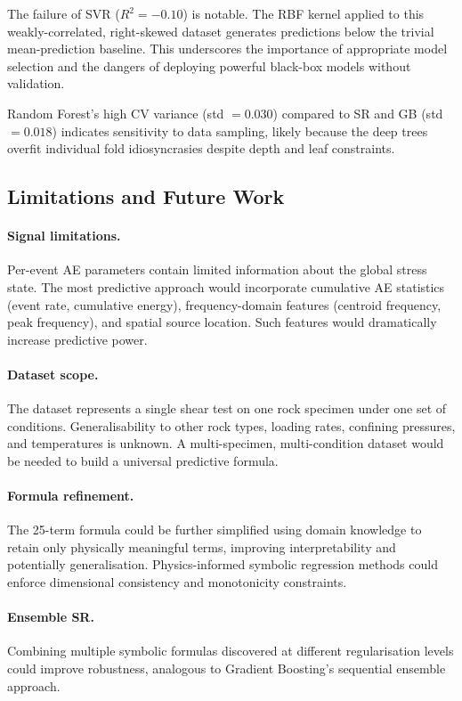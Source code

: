 \documentclass[12pt,a4paper]{article}
\begin{document}
The failure of SVR ($R^{2} = -0.10$) is notable. The RBF kernel applied to this
weakly-correlated, right-skewed dataset generates predictions below the trivial
mean-prediction baseline. This underscores the importance of appropriate model
selection and the dangers of deploying powerful black-box models without
validation.

Random Forest's high CV variance (std $= 0.030$) compared to SR and GB (std
$= 0.018$) indicates sensitivity to data sampling, likely because the deep trees
overfit individual fold idiosyncrasies despite depth and leaf constraints.

\subsection{Limitations and Future Work}
\label{subsec:limitations}

\paragraph{Signal limitations.}
Per-event AE parameters contain limited information about the global stress
state. The most predictive approach would incorporate cumulative AE statistics
(event rate, cumulative energy), frequency-domain features (centroid frequency,
peak frequency), and spatial source location. Such features would dramatically
increase predictive power.

\paragraph{Dataset scope.}
The dataset represents a single shear test on one rock specimen under one set of
conditions. Generalisability to other rock types, loading rates, confining
pressures, and temperatures is unknown. A multi-specimen, multi-condition dataset
would be needed to build a universal predictive formula.

\paragraph{Formula refinement.}
The 25-term formula could be further simplified using domain knowledge to retain
only physically meaningful terms, improving interpretability and potentially
generalisation. Physics-informed symbolic regression methods \citep{cranmer2020}
could enforce dimensional consistency and monotonicity constraints.

\paragraph{Ensemble SR.}
Combining multiple symbolic formulas discovered at different regularisation
levels could improve robustness, analogous to Gradient Boosting's sequential
ensemble approach.
\end{document}

